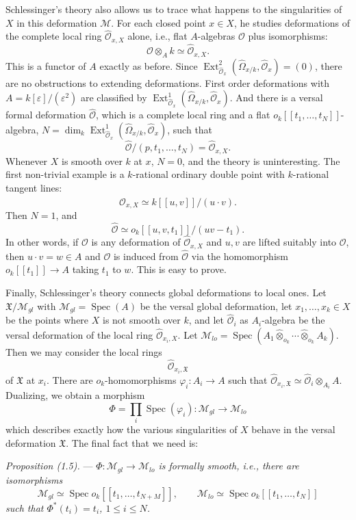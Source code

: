 \documentclass[10pt]{article}
\newcommand{\Spec}{\operatorname{Spec}}
\newcommand{\Ext}{\operatorname{Ext}}
\newcommand{\cO}{\mathcal O}
\newcommand{\cM}{\mathcal M}
\newcommand{\cX}{\mathfrak X}
\newcommand{\eps}{\varepsilon}
\begin{document}
Schlessinger's theory also allows us to trace what happens to the singularities of $X$ in this deformation $\cM$. For each closed point $x\in X$, he studies deformations of the complete local ring $\widehat{\cO}_{x,X}$ alone, i.e., flat $A$-algebras $\cO$ plus isomorphisms:
\[
\cO\otimes_A k\simeq \widehat{\cO}_{x,X}.
\]
This is a functor of $A$ exactly as before. Since $\Ext^2_{\widehat{\cO}_x}(\widehat{\Omega}_{x/k},\widehat{\cO}_x)=(0)$, there are no obstructions to extending deformations. First order deformations with $A=k[\eps]/(\eps^2)$ are classified by $\Ext^1_{\widehat{\cO}_x}(\widehat{\Omega}_{x/k},\widehat{\cO}_x)$. And there is a versal formal deformation $\widehat{\cO}$, which is a complete local ring and a flat $o_k[[t_1,\ldots,t_N]]$-algebra, $N=\dim_k\Ext^1_{\widehat{\cO}_x}(\widehat{\Omega}_{x/k},\widehat{\cO}_x)$, such that
\[
\widehat{\cO}/(p,t_1,\ldots,t_N)=\widehat{\cO}_{x,X}.
\]
Whenever $X$ is smooth over $k$ at $x$, $N=0$, and the theory is uninteresting. The first non-trivial example is a $k$-rational ordinary double point with $k$-rational tangent lines:
\[
\widehat{\cO}_{x,X}\simeq k[[u,v]]/(u\cdot v).
\]
Then $N=1$, and
\[
\widehat{\cO}\simeq o_k[[u,v,t_1]]/(uv-t_1).
\]
In other words, if $\cO$ is any deformation of $\widehat{\cO}_{x,X}$ and $u,v$ are lifted suitably into $\cO$, then $u\cdot v=w\in A$ and $\cO$ is induced from $\widehat{\cO}$ via the homomorphism $o_k[[t_1]]\to A$ taking $t_1$ to $w$. This is easy to prove.

Finally, Schlessinger's theory connects global deformations to local ones. Let $\cX/\cM_{gl}$ with $\cM_{gl}=\Spec(A)$ be the versal global deformation, let $x_1,\ldots,x_k\in X$ be the points where $X$ is not smooth over $k$, and let $\widehat{\cO}_i$ as $A_i$-algebra be the versal deformation of the local ring $\widehat{\cO}_{x_i,X}$. Let $\cM_{lo}=\Spec(A_1\widehat\otimes_{o_k}\cdots\widehat\otimes_{o_k}A_k)$. Then we may consider the local rings
\[
\widehat{\cO}_{x_i,\cX}
\]
of $\cX$ at $x_i$. There are $o_k$-homomorphisms $\varphi_i:A_i\to A$ such that $\widehat{\cO}_{x_i,\cX}\simeq\widehat{\cO}_i\otimes_{A_i}A$. Dualizing, we obtain a morphism
\[
\Phi=\prod_i \Spec(\varphi_i):\cM_{gl}\to\cM_{lo}
\]
which describes exactly how the various singularities of $X$ behave in the versal deformation $\cX$. The final fact that we need is:

\medskip
\noindent\emph{Proposition (1.5).} --- \emph{$\Phi:\cM_{gl}\to\cM_{lo}$ is formally smooth, i.e., there are isomorphisms}
\[
\cM_{gl}\simeq\Spec o_k[[t_1,\ldots,t_{N+M}]],\qquad
\cM_{lo}\simeq\Spec o_k[[t_1,\ldots,t_N]]
\]
\emph{such that $\Phi^*(t_i)=t_i$, $1\leq i\leq N$.}
\end{document}
